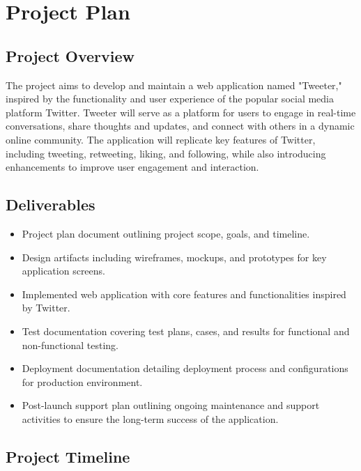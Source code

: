 \documentclass{article}
\begin{document}
\section{Project Plan}

\subsection{Project Overview}
The project aims to develop and maintain a web application named "Tweeter," inspired by the functionality and user experience of the popular social media platform Twitter. Tweeter will serve as a platform for users to engage in real-time conversations, share thoughts and updates, and connect with others in a dynamic online community. The application will replicate key features of Twitter, including tweeting, retweeting, liking, and following, while also introducing enhancements to improve user engagement and interaction.

\subsection{Deliverables}
\begin{itemize}
    \item Project plan document outlining project scope, goals, and timeline.
    \item Design artifacts including wireframes, mockups, and prototypes for key application screens.
    \item Implemented web application with core features and functionalities inspired by Twitter.
    \item Test documentation covering test plans, cases, and results for functional and non-functional testing.
    \item Deployment documentation detailing deployment process and configurations for production environment.
    \item Post-launch support plan outlining ongoing maintenance and support activities to ensure the long-term success of the application.
\end{itemize}

\subsection{Project Timeline}
\end{document}
